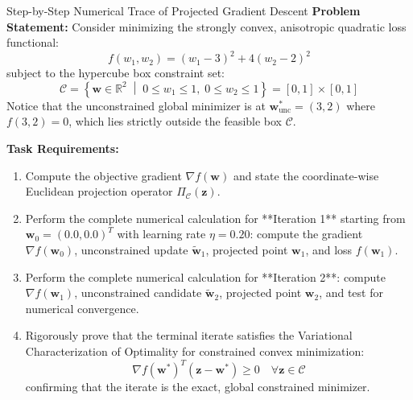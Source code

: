\begin{examplebox}[breakable]{Step-by-Step Numerical Trace of Projected Gradient Descent}
\textbf{Problem Statement:}
Consider minimizing the strongly convex, anisotropic quadratic loss functional:
\begin{equation}
f(w_1, w_2) = (w_1 - 3)^2 + 4(w_2 - 2)^2
\end{equation}
subject to the hypercube box constraint set:
\begin{equation}
\mathcal{C} = \left\{ \mathbf{w} \in \mathbb{R}^2 \;\middle|\; 0 \le w_1 \le 1, \; 0 \le w_2 \le 1 \right\} = [0, 1] \times [0, 1]
\end{equation}
Notice that the unconstrained global minimizer is at $\mathbf{w}_{\text{unc}}^* = (3, 2)$ where $f(3, 2) = 0$, which lies strictly outside the feasible box $\mathcal{C}$.

\textbf{Task Requirements:}
\begin{enumerate}
    \item Compute the objective gradient $\nabla f(\mathbf{w})$ and state the coordinate-wise Euclidean projection operator $\Pi_{\mathcal{C}}(\mathbf{z})$.
    \item Perform the complete numerical calculation for **Iteration 1** starting from $\mathbf{w}_0 = (0.0, 0.0)^T$ with learning rate $\eta = 0.20$: compute the gradient $\nabla f(\mathbf{w}_0)$, unconstrained update $\tilde{\mathbf{w}}_1$, projected point $\mathbf{w}_1$, and loss $f(\mathbf{w}_1)$.
    \item Perform the complete numerical calculation for **Iteration 2**: compute $\nabla f(\mathbf{w}_1)$, unconstrained candidate $\tilde{\mathbf{w}}_2$, projected point $\mathbf{w}_2$, and test for numerical convergence.
    \item Rigorously prove that the terminal iterate satisfies the Variational Characterization of Optimality for constrained convex minimization:
    \begin{equation}
    \nabla f(\mathbf{w}^*)^T (\mathbf{z} - \mathbf{w}^*) \ge 0 \quad \forall \mathbf{z} \in \mathcal{C}
    \end{equation}
    confirming that the iterate is the exact, global constrained minimizer.
\end{enumerate}

\tcblower


\end{examplebox}
